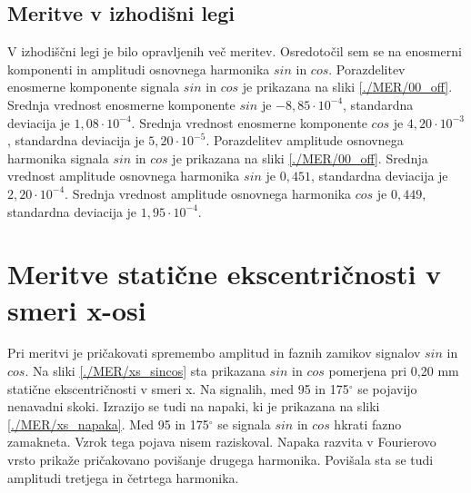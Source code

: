 \subsection{Meritve v izhodišni legi}
V izhodiščni legi je bilo opravljenih več meritev. Osredotočil sem se na enosmerni komponenti  in amplitudi osnovnega harmonika $sin$ in $cos$. 
Porazdelitev enosmerne komponente signala $sin$ in $cos$ je prikazana na sliki \ref{./MER/00_off}.
Srednja vrednost enosmerne komponente $sin$ je $-8,85 \cdot 10^{-4}$, standardna deviacija je $1,08\cdot 10^{-4}$.
Srednja vrednost enosmerne komponente $cos$ je $4,20 \cdot 10^{-3}$, standardna deviacija je $5,20\cdot 10^{-5}$.
Porazdelitev amplitude osnovnega harmonika signala $sin$ in $cos$ je prikazana na sliki \ref{./MER/00_off}.
Srednja vrednost amplitude osnovnega harmonika $sin$ je $0,451$, standardna deviacija je $2,20\cdot 10^{-4}$.
Srednja vrednost amplitude osnovnega harmonika $cos$ je $0,449$, standardna deviacija je $1,95\cdot 10^{-4}$.
\newpage
\section{Meritve statične ekscentričnosti v smeri x-osi}
Pri meritvi je pričakovati spremembo amplitud in faznih zamikov signalov $sin$ in $cos$. Na sliki \ref{./MER/xs_sincos} sta prikazana $sin$ in $cos$ pomerjena pri 0,20 mm statične ekscentričnosti v smeri x. Na signalih, med 95 in 175$^\circ$ se pojavijo nenavadni skoki.
Izrazijo se tudi na napaki, ki je prikazana na sliki \ref{./MER/xs_napaka}. Med 95 in 175$^\circ$ se signala $sin$ in $cos$ hkrati fazno zamakneta. Vzrok tega pojava nisem raziskoval. Napaka razvita v Fourierovo vrsto prikaže pričakovano povišanje drugega harmonika. Povišala sta se tudi amplitudi tretjega in četrtega harmonika.
\newpage
